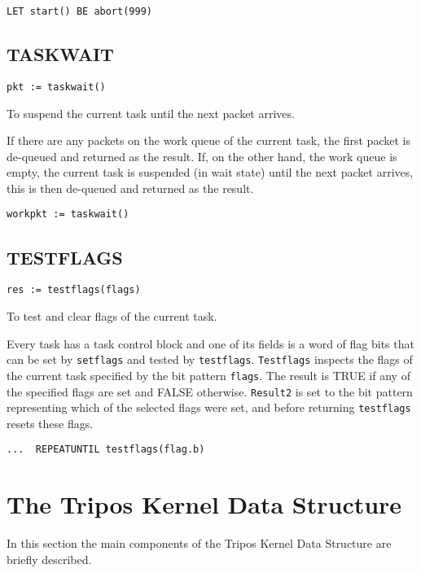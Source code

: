 \verb|LET start() BE abort(999)|


\subsection{TASKWAIT}

\verb|pkt := taskwait()|

 To suspend the current task until the next packet
arrives.


     If there are any packets on the work queue of the current task,
the first packet is de-queued and returned as the result.  If, on the
other hand, the work queue is empty, the current task is suspended (in
wait state) until the next packet arrives, this is then de-queued and
returned as the result.

\verb|workpkt := taskwait()|


\subsection{TESTFLAGS}

\verb|res := testflags(flags)|

  To test and clear flags of the current task.


     Every task has a task control block and one of its fields is a
word of flag bits that can be set by \verb|setflags| and tested by
\verb|testflags|.  \verb|Testflags| inspects the flags of the current
task specified by the bit pattern \verb|flags|.  The result is TRUE if
any of the specified flags are set and FALSE otherwise.
\verb|Result2| is set to the bit pattern representing which of the
selected flags were set, and before returning \verb|testflags| resets
these flags.

\verb|...  REPEATUNTIL testflags(flag.b)|


\smallskip

\section{The Tripos Kernel Data Structure}

In this section the main components of the Tripos Kernel Data
Structure are briefly described.

